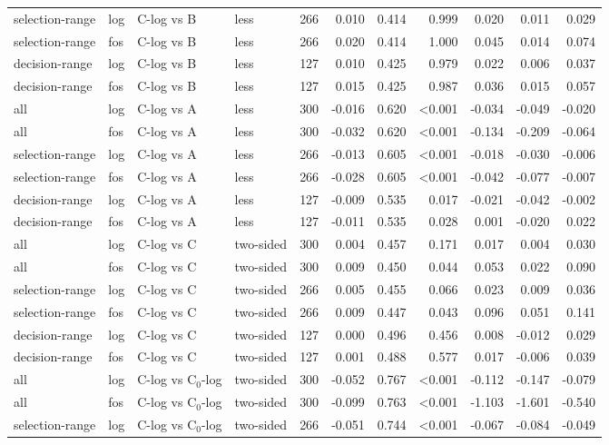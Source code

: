 \begin{longtable}{llllrrrrrrr}
selection-range & log & C-log vs B & less & 266 & 0.010 & 0.414 & 0.999 & 0.020 & 0.011 & 0.029 \\
selection-range & fos & C-log vs B & less & 266 & 0.020 & 0.414 & 1.000 & 0.045 & 0.014 & 0.074 \\
decision-range & log & C-log vs B & less & 127 & 0.010 & 0.425 & 0.979 & 0.022 & 0.006 & 0.037 \\
decision-range & fos & C-log vs B & less & 127 & 0.015 & 0.425 & 0.987 & 0.036 & 0.015 & 0.057 \\
all & log & C-log vs A & less & 300 & -0.016 & 0.620 & <0.001 & -0.034 & -0.049 & -0.020 \\
all & fos & C-log vs A & less & 300 & -0.032 & 0.620 & <0.001 & -0.134 & -0.209 & -0.064 \\
selection-range & log & C-log vs A & less & 266 & -0.013 & 0.605 & <0.001 & -0.018 & -0.030 & -0.006 \\
selection-range & fos & C-log vs A & less & 266 & -0.028 & 0.605 & <0.001 & -0.042 & -0.077 & -0.007 \\
decision-range & log & C-log vs A & less & 127 & -0.009 & 0.535 & 0.017 & -0.021 & -0.042 & -0.002 \\
decision-range & fos & C-log vs A & less & 127 & -0.011 & 0.535 & 0.028 & 0.001 & -0.020 & 0.022 \\
all & log & C-log vs C & two-sided & 300 & 0.004 & 0.457 & 0.171 & 0.017 & 0.004 & 0.030 \\
all & fos & C-log vs C & two-sided & 300 & 0.009 & 0.450 & 0.044 & 0.053 & 0.022 & 0.090 \\
selection-range & log & C-log vs C & two-sided & 266 & 0.005 & 0.455 & 0.066 & 0.023 & 0.009 & 0.036 \\
selection-range & fos & C-log vs C & two-sided & 266 & 0.009 & 0.447 & 0.043 & 0.096 & 0.051 & 0.141 \\
decision-range & log & C-log vs C & two-sided & 127 & 0.000 & 0.496 & 0.456 & 0.008 & -0.012 & 0.029 \\
decision-range & fos & C-log vs C & two-sided & 127 & 0.001 & 0.488 & 0.577 & 0.017 & -0.006 & 0.039 \\
all & log & C-log vs C$_0$-log & two-sided & 300 & -0.052 & 0.767 & <0.001 & -0.112 & -0.147 & -0.079 \\
all & fos & C-log vs C$_0$-log & two-sided & 300 & -0.099 & 0.763 & <0.001 & -1.103 & -1.601 & -0.540 \\
selection-range & log & C-log vs C$_0$-log & two-sided & 266 & -0.051 & 0.744 & <0.001 & -0.067 & -0.084 & -0.049 \\

\end{longtable}
